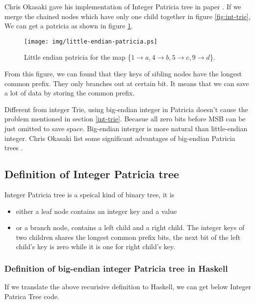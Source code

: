 \documentclass{article}
\begin{document}
Chris Okasaki gave his implementation of Integer Patricia tree in paper \cite{okasaki-int-map}. 
If we merge the chained nodes which have only one child together in figure \ref{fig:int-trie},
We can get a patricia as shown in figure \ref{fig:little-endian-patricia}.

\begin{figure}[htbp]
       \begin{center}
	\texttt{[image: img/little-endian-patricia.ps]}
        \caption{Little endian patricia for the map 
                        \{$ 1 \rightarrow a, 4 \rightarrow b, 5 \rightarrow c, 9 \rightarrow d$\}.} 
        \label{fig:little-endian-patricia}
       \end{center}
\end{figure}

From this figure, we can found that they keys of sibling nodes have the longest common prefix.
They only branches out at certain bit. It means that we can save a lot of data by storing the common
prefix. 

Different from integer Trie, using big-endian integer in Patricia doesn't cause the problem mentioned
in section \ref{int-trie}. Becasue all zero bits before MSB can be just omitted to save space. Big-endian
interger is more natural than little-endian integer. Chris Okasaki list some significant advantages
of big-endian Patricia trees \cite{okasaki-int-map}.

\subsection{Definition of Integer Patricia tree}
Integer Patricia tree is a speical kind of binary tree, it is
\begin{itemize}
\item either a leaf node contains an integer key and a value
\item or a branch node, contains a left child and a right child. The
integer keys of two children shares the longest common prefix bits,
the next bit of the left child's key is zero while it is one for right
child's key.
\end{itemize}

\subsubsection*{Definition of big-endian integer Patricia tree in Haskell}
If we translate the above recurisive definition to Haskell, we can get
below Integer Patrica Tree code.
\end{document}
